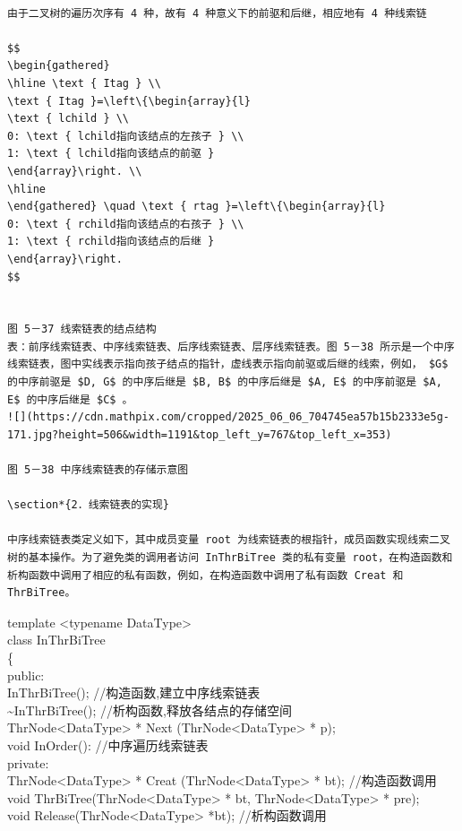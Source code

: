 \documentclass[10pt]{article}
\begin{document}
\begin{verbatim}

由于二叉树的遍历次序有 4 种，故有 4 种意义下的前驱和后继，相应地有 4 种线索链

$$
\begin{gathered}
\hline \text { Itag } \\
\text { Itag }=\left\{\begin{array}{l}
\text { lchild } \\
0: \text { lchild指向该结点的左孩子 } \\
1: \text { lchild指向该结点的前驱 }
\end{array}\right. \\
\hline
\end{gathered} \quad \text { rtag }=\left\{\begin{array}{l}
0: \text { rchild指向该结点的右孩子 } \\
1: \text { rchild指向该结点的后继 }
\end{array}\right.
$$


图 5－37 线索链表的结点结构
表：前序线索链表、中序线索链表、后序线索链表、层序线索链表。图 5－38 所示是一个中序线索链表，图中实线表示指向孩子结点的指针，虚线表示指向前驱或后继的线索，例如， $G$ 的中序前驱是 $D, G$ 的中序后继是 $B, B$ 的中序后继是 $A, E$ 的中序前驱是 $A, E$ 的中序后继是 $C$ 。
![](https://cdn.mathpix.com/cropped/2025_06_06_704745ea57b15b2333e5g-171.jpg?height=506&width=1191&top_left_y=767&top_left_x=353)

图 5－38 中序线索链表的存储示意图

\section*{2．线索链表的实现}

中序线索链表类定义如下，其中成员变量 root 为线索链表的根指针，成员函数实现线索二叉树的基本操作。为了避免类的调用者访问 InThrBiTree 类的私有变量 root，在构造函数和析构函数中调用了相应的私有函数，例如，在构造函数中调用了私有函数 Creat 和 ThrBiTree。
\end{verbatim}

template <typename DataType>\\
class InThrBiTree\\
\{\\
public:\\
InThrBiTree(); //构造函数,建立中序线索链表\\
\~{}InThrBiTree(); //析构函数,释放各结点的存储空间\\
ThrNode<DataType> * Next (ThrNode<DataType> * p);\\
void InOrder(): //中序遍历线索链表\\
private:\\
ThrNode<DataType> * Creat (ThrNode<DataType> * bt); //构造函数调用\\
void ThrBiTree(ThrNode<DataType> * bt, ThrNode<DataType> * pre);\\
void Release(ThrNode<DataType> *bt); //析构函数调用
\end{document}
